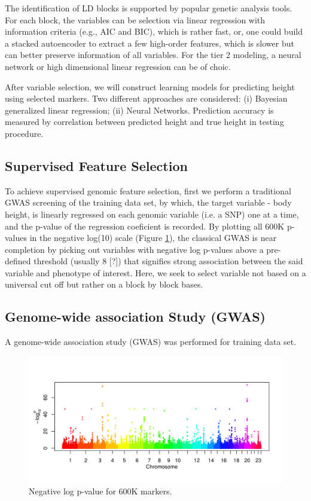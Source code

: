 \documentclass[acmtog, authorversion]{acmart}
\begin{document}
The identification of LD blocks is supported by popular genetic analysis tools. For each block, the variables can be selection via linear regression with information criteria (e.g., AIC and BIC), which is rather fast, or, one could build a stacked autoencoder to extract a few high-order features, which is slower but can better preserve information of all variables. For the tier 2 modeling, a neural network or high dimensional linear regression can be of choic.

After variable selection, we will construct learning models for predicting height using selected markers. Two different approaches are considered: (i) Bayesian generalized linear regression; (ii) Neural Networks. Prediction accuracy is measured by correlation between predicted height and true height in testing procedure. 

\subsection{Supervised Feature Selection}
To achieve supervised genomic feature selection, first we perform a traditional GWAS screening of the training data set, by which, the target variable - body height, is linearly regressed on each genomic variable (i.e. a SNP) one at a time, and the p-value of the regression coeficient is recorded. By plotting all 600K p-values in the negative log(10) scale (Figure \ref{gwas}), the classical GWAS is near completion by picking out variables with negative log p-values above a pre-defined threshold (usually 8 [?]) that signifies strong association between the said variable and phenotype of interest. Here, we seek to select variable not based on a universal cut off but rather on a block by block bases.

\subsection{Genome-wide association Study (GWAS)}
A genome-wide association study (GWAS) was performed for training data set. 

\begin{figure}[h]
  \centering
  \includegraphics[width=3.5 in, trim=0 0 0in 0]{img/gwas_height}
  \caption{Negative log p-value for 600K markers.}
  \label{gwas}
\end{figure}
\end{document}
